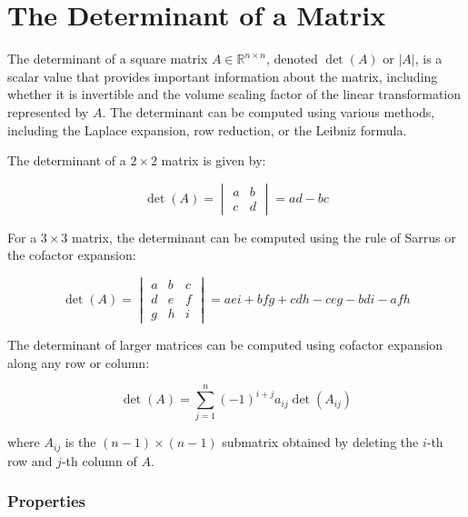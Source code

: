 \section{The Determinant of a Matrix}

The determinant of a square matrix \(A \in \mathbb{R}^{n \times n}\), denoted \(\det(A)\) or \(|A|\), is a 
scalar value that provides important information about the matrix, including whether it is 
invertible and the volume scaling factor of the linear transformation represented by \(A\).
The determinant can be computed using various methods, including the Laplace 
expansion, row reduction, or the Leibniz formula.

The determinant of a \(2 \times 2\) matrix is given by:

\begin{equation*}
\det(A) =
\begin{vmatrix}
a & b \\
c & d
\end{vmatrix}
= ad - bc
\end{equation*}

For a \(3 \times 3\) matrix, the determinant can be computed using the rule of Sarrus or the cofactor expansion:

\begin{equation*}
\det(A) =
\begin{vmatrix}
a & b & c \\
d & e & f \\
g & h & i
\end{vmatrix}
= aei + bfg + cdh - ceg - bdi - afh
\end{equation*}

The determinant of larger matrices can be computed using cofactor expansion along any row or column:

\begin{equation*}
\det(A) = \sum_{j=1}^{n} (-1)^{i+j} a_{ij} \det(A_{ij})
\end{equation*}

where \(A_{ij}\) is the \((n-1) \times (n-1)\) submatrix obtained by deleting the \(i\)-th row and \(j\)-th column of \(A\).

\subsubsection{Properties}


